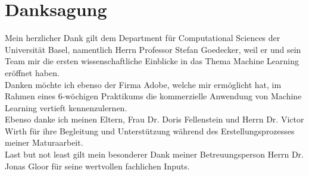 \section*{Danksagung}
Mein herzlicher Dank gilt dem Department für Computational Sciences der
Universität Basel, namentlich Herrn Professor Stefan Goedecker, weil er und sein Team
mir die ersten wissenschaftliche Einblicke in das Thema Machine Learning
eröffnet haben. \\
Danken möchte ich ebenso der Firma Adobe, welche mir ermöglicht hat, im Rahmen
eines 6-wöchigen Praktikums die kommerzielle Anwendung von Machine Learning
vertieft kennenzulernen. \\
Ebenso danke ich meinen Eltern, Frau Dr. Doris Fellenstein und Herrn Dr. Victor
Wirth für ihre Begleitung und Unterstützung während des Erstellungsprozesses
meiner Maturaarbeit. \\
Last but not least gilt mein besonderer Dank meiner Betreuungsperson Herrn Dr. Jonas
Gloor für seine wertvollen fachlichen Inputs.

